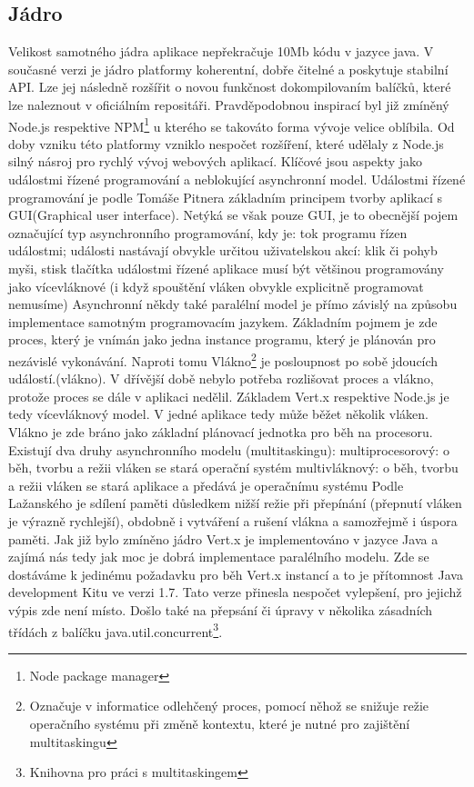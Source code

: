 \subsection{Jádro}

Velikost samotného jádra aplikace nepřekračuje 10Mb kódu v jazyce java. V současné verzi je jádro platformy koherentní, dobře čitelné a poskytuje stabilní API. Lze jej následně rozšířit o novou funkčnost dokompilovaním balíčků, které lze naleznout v oficiálním repositáři. Pravděpodobnou inspirací byl již zmíněný Node.js respektive NPM\footnote{Node package manager} u kterého se takováto forma vývoje velice oblíbila. Od doby vzniku této platformy vzniklo nespočet rozšíření, které udělaly z Node.js silný násroj pro rychlý vývoj webových aplikací. 
Klíčové jsou aspekty jako událostmi řízené programování a neblokující asynchronní model. Událostmi řízené programování je podle Tomáše Pitnera\cite{javaProgramovani} základním principem tvorby aplikací s GUI(Graphical user interface). Netýká se však pouze GUI, je to obecnější pojem označující typ asynchronního programování, kdy je:
tok programu řízen událostmi;
události nastávají obvykle určitou uživatelskou akcí: klik či pohyb myši, stisk tlačítka
událostmi řízené aplikace musí být většinou programovány jako vícevláknové (i když spouštění vláken obvykle explicitně programovat nemusíme)
Asynchronní někdy také paralélní model je přímo závislý na způsobu implementace samotným programovacím jazykem. Základním pojmem je zde proces, který je vnímán jako jedna instance programu, který je plánován pro nezávislé vykonávání. Naproti tomu Vlákno\footnote{Označuje v informatice odlehčený proces, pomocí něhož se snižuje režie operačního systému při změně kontextu, které je nutné pro zajištění multitaskingu} je posloupnost po sobě jdoucích událostí.(vlákno). V dřívější době nebylo potřeba rozlišovat proces a vlákno, protože proces se dále v aplikaci nedělil. Základem Vert.x respektive Node.js je tedy vícevláknový model. V jedné aplikace tedy může běžet několik vláken. Vlákno je zde bráno jako základní plánovací jednotka pro běh na procesoru. 
Existují dva druhy asynchronního modelu (multitaskingu):
multiprocesorový: o běh, tvorbu a režii vláken se stará operační systém
multivláknový: o běh, tvorbu a režii vláken se stará aplikace a předává je operačnímu systému
Podle Lažanského\cite{vlaknaCvut} je sdílení paměti důsledkem nižší režie při přepínání (přepnutí vláken je výrazně rychlejší), obdobně i vytváření a rušení vlákna a samozřejmě i úspora paměti.
Jak již bylo zmíněno jádro Vert.x je implementováno v jazyce Java a zajímá nás tedy jak moc je dobrá implementace paralélního modelu. Zde se dostáváme k jedinému požadavku pro běh Vert.x instancí a to je přítomnost Java development Kitu ve verzi 1.7. Tato verze přinesla nespočet vylepšení, pro jejichž výpis zde není místo. Došlo také na přepsání či úpravy v několika zásadních třídách z balíčku java.util.concurrent\footnote{Knihovna pro práci s multitaskingem}.
